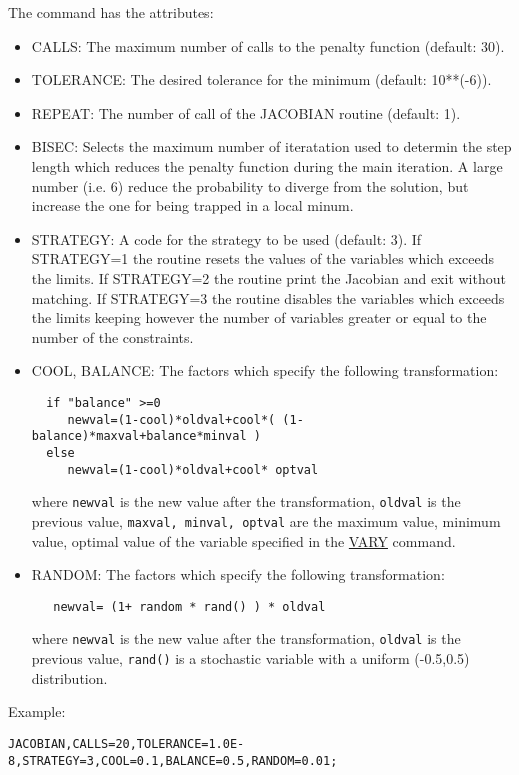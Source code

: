 The command has the attributes: 
\begin{itemize}
	\item CALLS: The maximum number of calls to the penalty function (default: 30). 
	\item TOLERANCE: The desired tolerance for the minimum (default: 10**(-6)). 
	\item REPEAT: The number of call of the JACOBIAN routine (default: 1). 
	\item BISEC: Selects the maximum number of iteratation used to determin the step length which reduces the penalty function during the main iteration. A large number (i.e. 6) reduce the probability to diverge from the solution, but increase the one for being trapped in a local minum. 
	\item STRATEGY: A code for the strategy to be used (default: 3). If STRATEGY=1 the routine resets the values of the variables which exceeds the limits. If STRATEGY=2 the routine print the Jacobian and exit without matching. If STRATEGY=3 the routine  disables the variables which exceeds the limits keeping however the number of variables greater or equal to the number of the constraints. 
	\item COOL, BALANCE: The factors which specify the following transformation:

\begin{verbatim}
  if "balance" >=0
     newval=(1-cool)*oldval+cool*( (1-balance)*maxval+balance*minval )
  else
     newval=(1-cool)*oldval+cool* optval
\end{verbatim}
where \texttt{newval} is the new value after the transformation, \texttt{oldval} is the previous value, \texttt{maxval, minval, optval} are the maximum value, minimum value, optimal value of the variable specified in the \href{match_vary.html}{VARY} command. 
	\item RANDOM: The factors which specify the following transformation:

\begin{verbatim}
   newval= (1+ random * rand() ) * oldval
\end{verbatim}

where \texttt{newval} is the new value after the transformation, \texttt{oldval} is the previous value, \texttt{rand()} is a stochastic variable with a uniform (-0.5,0.5) distribution. 
\end{itemize} 

Example: 
\begin{verbatim}
JACOBIAN,CALLS=20,TOLERANCE=1.0E-8,STRATEGY=3,COOL=0.1,BALANCE=0.5,RANDOM=0.01;
\end{verbatim}


